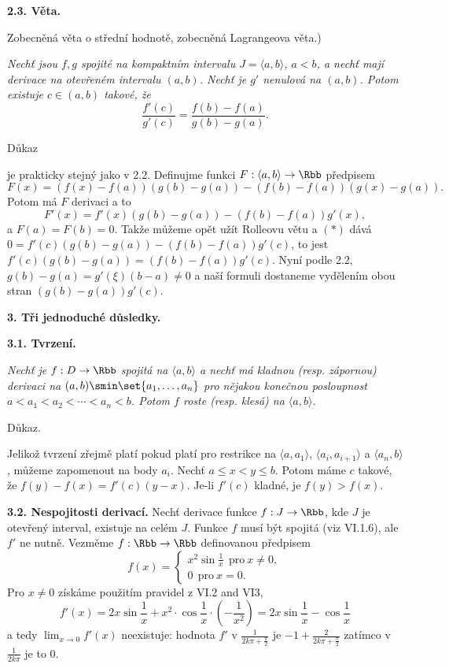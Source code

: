 \documentclass[12pt]{article}
\begin{document}
{\bigskip

{\bf 2.3. Věta.} {Zobecněná věta o střední hodnotě, zobecněná Lagrangeova věta.) {\em Nechť jsou $f,g$ spojité na kompaktním intervalu $J=\langle a,b\rangle$, $a<b$, a   nechť mají derivace na otevřeném intervalu
  $(a,b)$. Nechť je $g'$ nenulová na $(a,b)$. Potom existuje $c\in (a,b)$ takové, že
  $$
  \frac{f'(c)}{g'(c)}=\frac{f(b)-f(a)}{g(b)-g(a)}.
  $$
  
  Důkaz} je prakticky stejný jako v 2.2. Definujme funkci $F:\langle a,b\rangle\to\Rbb$ předpisem
  $$
  F(x)=(f(x)-f(a))(g(b)-g(a))- (f(b)-f(a))(g(x)-g(a)).
  $$
  Potom má $F$ derivaci a to
  \begin{equation}
  F'(x)=f'(x)(g(b)-g(a))-(f(b)-f(a))g'(x), \tag{$*$}
  \end{equation}
a $F(a)=F(b) =0$. Takže můžeme opět užít  Rolleovu větu a $(*)$ dává
 $0=f'(c)(g(b)-g(a))-(f(b)-f(a))g'(c)$, to jest $f'(c)(g(b)-g(a))=(f(b)-f(a))g'(c)$.  Nyní podle 2.2, $g(b)-g(a)=g'(\xi)(b-a)\neq 0$ a naší formuli dostaneme vydělením obou stran $(g(b)-g(a))g'(c)$. \sq
 
 \vskip10mm
 
 {\large\bf 3. Tři jednoduché důsledky.}
 
 \bigskip
 
 {\bf 3.1.  Tvrzení.}  {\em Nechť je $f:D\to \Rbb$ spojitá na $\langle a,b\rangle$ a nechť má kladnou (resp. zápornou) derivaci na $(a,b)\smin\set{a_1,\dots,a_n}$ pro nějakou konečnou posloupnost $a<a_1<a_2<\cdots<a_n<b$. Potom $f$ roste (resp. klesá) na $\langle a,b\rangle$.
 
 Důkaz.} Jelikož tvrzení zřejmě platí pokud platí pro restrikce na $\langle a,a_1\rangle$, $\langle a_i,a_{i+1}\rangle$ a $\langle a_{n},b\rangle$, můžeme zapomenout na body $a_i$. Nechť $a\leq x<y\leq b$. Potom máme $c$ takové, že $f(y)-f(x)=f'(c)(y-x)$. Je-li $f'(c)$ kladné, je $f(y)>f(x)$. \sq
 
 \bigskip
 
 {\bf 3.2. Nespojitosti derivací.} Nechť derivace funkce $f:J\to\Rbb$, kde $J$ je otevřený interval, existuje na celém $J$. Funkce $f$ musí být spojitá (viz VI.1.6), ale $f'$ ne nutně. Vezměme $f:\Rbb\to\Rbb$ definovanou předpisem
 $$
 f(x)=\begin{cases}x^2\sin\frac1{x}\ \  \text{pro} \ x\neq 0,\\
                    0\ \ \text{pro} \ x=0.\end{cases}
$$
Pro $x\neq 0$ získáme použitím pravidel z VI.2 and VI3,
$$
f'(x)=2x\sin\frac1{x}+x^2\cdot\cos\frac1{x}\cdot\left(-\frac1{x^2}\right) =
2x\sin\frac1{x}-\cos\frac1{x}
$$
a tedy $\lim_{x\to 0}f'(x)$ neexistuje: hodnota $f'$ v
$\frac{1}{2k\pi+\frac{\pi}{2}}$ je $-1+\frac{2}{2k\pi+\frac{\pi}{2}}$ zatímco v $\frac{1}{2k\pi}$ je to 0.

}}
\end{document}
